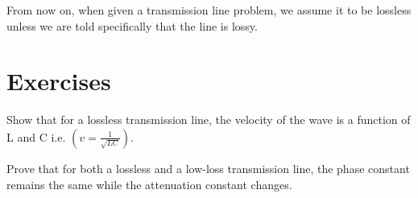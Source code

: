 From now on, when given a transmission line problem, we assume it to be lossless unless we are told specifically that the line is lossy.

\newpage
\section*{Exercises}
\begin{ExerciseList}
\Exercise[label={ex41}]
Show that for a lossless transmission line, the velocity of the wave is a function of L and C i.e. $\left(v = \frac{1}{\sqrt{LC}}\right)$.

\Exercise[label={ex42}]
Prove that for both a lossless and a low-loss transmission line, the phase constant remains the same while the attenuation constant changes.
\end{ExerciseList}